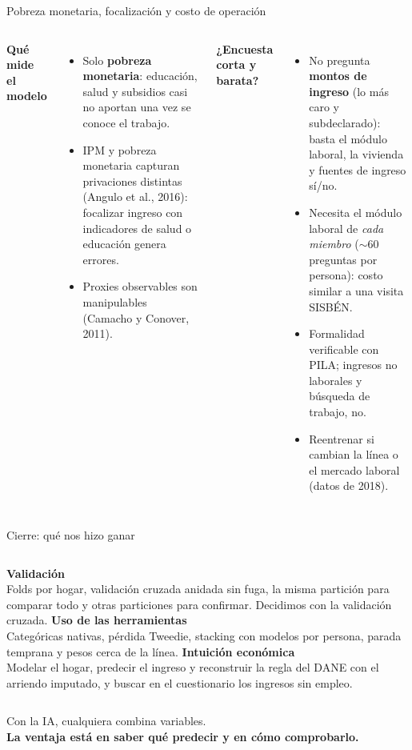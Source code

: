 \documentclass[aspectratio=169,10pt]{beamer}
\newcommand{\tema}[1]{\textbf{#1}}
\begin{document}
\begin{frame}{Pobreza monetaria, focalización y costo de operación}
\begin{columns}[T]
\small
\tema{Qué mide el modelo}
\begin{itemize}
  \item Solo \textbf{pobreza monetaria}: educación, salud y subsidios casi
    no aportan una vez se conoce el trabajo.
  \item IPM y pobreza monetaria capturan privaciones distintas (Angulo et
    al., 2016): focalizar ingreso con indicadores de salud o educación
    genera errores.
  \item Proxies observables son manipulables (Camacho y Conover, 2011).
\end{itemize}

\small
\tema{¿Encuesta corta y barata?}
\begin{itemize}
  \item[\textcolor{verde}{+}] No pregunta \textbf{montos de ingreso} (lo más
    caro y subdeclarado): basta el módulo laboral, la vivienda y fuentes de
    ingreso sí/no.
  \item[\textcolor{rojo}{--}] Necesita el módulo laboral de \emph{cada
    miembro} ($\sim$60 preguntas por persona): costo similar a una visita
    SISBÉN.
  \item[\textcolor{rojo}{--}] Formalidad verificable con PILA; ingresos no
    laborales y búsqueda de trabajo, no.
  \item[\textcolor{gris}{$\bullet$}] Reentrenar si cambian la línea o el
    mercado laboral (datos de 2018).
\end{itemize}
\end{columns}
\end{frame}

\begin{frame}{Cierre: qué nos hizo ganar}
\begin{columns}[T]
\tema{Validación}\\[1mm]
\small Folds por hogar, validación cruzada anidada sin fuga, la misma
partición para comparar todo y otras particiones para confirmar.
Decidimos con la validación cruzada.
\tema{Uso de las herramientas}\\[1mm]
\small Categóricas nativas, pérdida Tweedie, stacking con modelos por
persona, parada temprana y pesos cerca de la línea.
\tema{Intuición económica}\\[1mm]
\small Modelar el hogar, predecir el ingreso y reconstruir la regla del
DANE con el arriendo imputado, y buscar en el cuestionario los ingresos
sin empleo.
\end{columns}
\vspace{8mm}
\begin{center}
\large Con la IA, cualquiera combina variables. \\[1mm]
\textbf{La ventaja está en saber qué predecir y en cómo comprobarlo.}
\end{center}
\end{frame}
\end{document}
